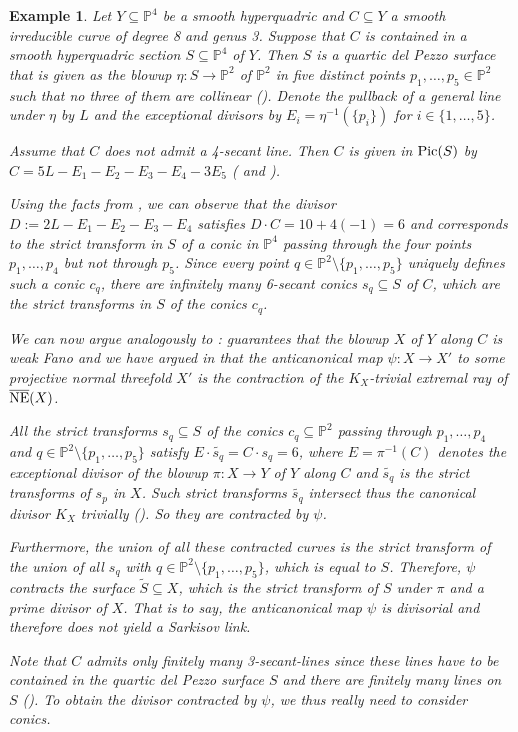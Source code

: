 \documentclass[english,11pt,reqno]{amsart}
\newcommand{\sub}{\subseteq}
\newcommand{\Ptwo}{\mathbb{P}^2}
\newcommand{\Pfour}{\mathbb{P}^4}
\newcommand{\Pic}{\textup{Pic}}
\newcommand{\NE}{\overline{\textup{NE}}}
\newtheorem{ex}[thm]{Example}
\begin{document}
%
\begin{ex}
\label{ex:curve_degre8_genus_3}
Let $Y\sub \Pfour$ be a smooth hyperquadric and $C\sub Y$ a smooth irreducible curve of degree 8 and genus 3. Suppose that $C$ is contained in a smooth hyperquadric section $S\sub \Pfour$ of $Y$. Then $S$ is a quartic del Pezzo surface that is given as the blowup $\eta:S\rightarrow \Ptwo$ of $\Ptwo$ in five distinct points $p_1,\dots,p_5\in\Ptwo$ such that no three of them are collinear (). Denote the pullback of a general line under $\eta$ by $L$ and the exceptional divisors by $E_i=\eta^{-1}(\{p_i\})$ for $i\in\{1,\dots,5\}$. \par 
Assume that $C$ does not admit a 4-secant line. Then $C$ is given in $\Pic(S)$ by $C=5L-E_1-E_2-E_3-E_4-3E_5$ ( and ).\par 
Using the facts from , we can observe that the divisor $D:=2L-E_1-E_2-E_3-E_4$ satisfies $D\cdot C=10+4(-1)=6$ and corresponds to the strict transform in $S$ of a conic in $\Pfour$ passing through the four points $p_1,\dots,p_4$ but not through $p_5$. Since every point $q\in\Ptwo\setminus\{p_1,\dots,p_5\}$ uniquely defines such a conic $c_q$, there are infinitely many 6-secant conics $s_q\sub S$ of $C$, which are the strict transforms in $S$ of the conics $c_q$. \par 
We can now argue analogously to :  guarantees that the blowup $X$ of $Y$ along $C$ is weak Fano and we have argued in  that the anticanonical map $\psi:X\rightarrow X'$ to some projective normal threefold $X'$ is the contraction of the $K_X$-trivial extremal ray of $\NE(X)$. \par 
All the strict transforms $s_q\sub S$ of the conics $c_q\sub \Ptwo$ passing through $p_1,\dots,p_4$ and $q\in\Ptwo\setminus \{p_1,\dots,p_5\}$ satisfy $E\cdot \widetilde{s_q}=C\cdot s_q=6$, where $E=\pi^{-1}(C)$ denotes the exceptional divisor of the blowup $\pi:X\rightarrow Y$ of $Y$ along $C$ and $\widetilde{s_q}$ is the strict transforms of $s_p$ in $X$. Such strict transforms $\widetilde{s_q}$ intersect thus the canonical divisor $K_X$ trivially (). So they are contracted by $\psi$. \par 
Furthermore, the union of all these contracted curves is the strict transform of the union of all $s_q$ with $q\in\Ptwo\setminus \{p_1,\dots,p_5\}$, which is equal to $S$. Therefore, $\psi$ contracts the surface $\widetilde{S}\sub X$, which is the strict transform of $S$ under $\pi$ and a prime divisor of $X$.
That is to say, the anticanonical map $\psi$ is divisorial and therefore does not yield a Sarkisov link.\par 
Note that $C$ admits only finitely many 3-secant-lines since these lines have to be contained in the quartic del Pezzo surface $S$ and there are finitely many lines on $S$ (). To obtain the divisor contracted by $\psi$, we thus really need to consider conics.
\end{ex}
\end{document}

